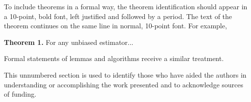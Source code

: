 To include theorems in a formal way, the theorem identification should appear in a 10-point, bold font, left justified and followed by a period.  The text of the theorem continues on the same line in normal, 10-point font.  For example,

\noindent\textbf{Theorem 1.} For any unbiased estimator...

Formal statements of lemmas and algorithms receive a similar treatment.

\acknowledgments %

This unnumbered section is used to identify those who have aided the authors in understanding or accomplishing the work presented and to acknowledge sources of funding.
